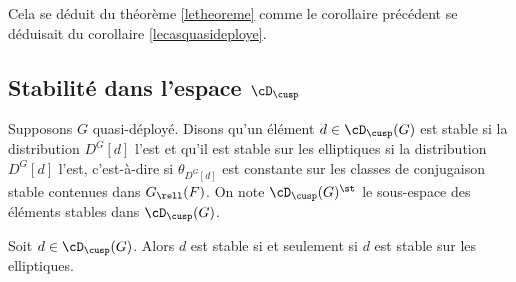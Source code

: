 Cela se déduit du théorème \ref{letheoreme} comme le corollaire précédent se déduisait du corollaire \ref{lecasquasideploye}.

\subsection{Stabilité dans l'espace \texorpdfstring{$\cD_{\cusp}$}{Dcusp}}\label{stabilite}
Supposons $G$ quasi-déployé. Disons qu'un élément $d\in \cD_{\cusp}(G)$ est stable si la distribution $D^G[d]$ l'est et qu'il est stable sur les elliptiques si la distribution $D^G[d]$ l'est, c'est-à-dire si $\theta_{D^G[d]}$ est constante sur les classes de conjugaison stable contenues dans $G_{\rell}(F)$. On note $\cD_{\cusp}(G)^{\st}$ le sous-espace des éléments stables dans $\cD_{\cusp}(G)$.

\begin{prop*}
Soit $d\in \cD_{\cusp}(G)$. Alors $d$ est stable si et seulement si $d$ est stable sur les elliptiques.
\end{prop*}

